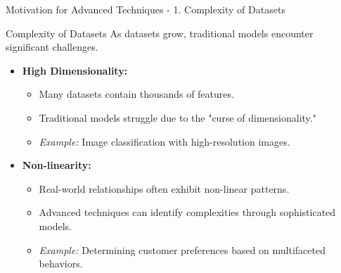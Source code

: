 \documentclass[aspectratio=169]{beamer}
\begin{document}
\begin{frame}[fragile]{Motivation for Advanced Techniques - 1. Complexity of Datasets}
    \begin{block}{Complexity of Datasets}
        As datasets grow, traditional models encounter significant challenges.
    \end{block}
    \begin{itemize}
        \item \textbf{High Dimensionality:} 
            \begin{itemize}
                \item Many datasets contain thousands of features.
                \item Traditional models struggle due to the "curse of dimensionality."
                \item \textit{Example:} Image classification with high-resolution images.
            \end{itemize}
        \item \textbf{Non-linearity:} 
            \begin{itemize}
                \item Real-world relationships often exhibit non-linear patterns.
                \item Advanced techniques can identify complexities through sophisticated models.
                \item \textit{Example:} Determining customer preferences based on multifaceted behaviors.
            \end{itemize}
    \end{itemize}
\end{frame}
\end{document}
